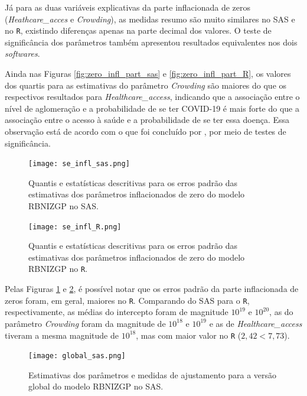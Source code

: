 \documentclass[12pt, a4paper, twoside]{report}
\numberwithin{equation}{section} %
\begin{document}
Já para as duas variáveis explicativas da parte inflacionada de zeros (\textit{Heathcare\_acces} e \textit{Crowding}), as medidas resumo são muito similares no SAS e no \texttt{R}, existindo diferenças apenas na parte decimal dos valores. O teste de significância dos parâmetros também apresentou resultados equivalentes nos dois \textit{softwares}.

Ainda nas Figuras \ref{fig:zero_infl_part_sas} e \ref{fig:zero_infl_part_R}, os valores dos quartis para as estimativas do parâmetro \textit{Crowding} são maiores do que os respectivos resultados para \textit{Healthcare\_access}, indicando que a associação entre o nível de aglomeração e a probabilidade de se ter COVID-19 é mais forte do que a associação entre o acesso à saúde e a probabilidade de se ter essa doença. Essa observação está de acordo com o que foi concluído por \cite{sousa2022}, por meio de testes de significância.

\begin{figure}[!htb]
    \centering
    \texttt{[image: se\_infl\_sas.png]}
    \caption{Quantis e estatísticas descritivas para os erros padrão das estimativas dos parâmetros inflacionados de zero do modelo RBNIZGP no SAS.}
\label{fig:se_infl_sas}
\end{figure}

\begin{figure}[!htb]
    \centering
    \texttt{[image: se\_infl\_R.png]}
    \caption{Quantis e estatísticas descritivas para os erros padrão das estimativas dos parâmetros inflacionados de zero do modelo RBNIZGP no \texttt{R}.}
\label{fig:se_infl_R}
\end{figure}

Pelas Figuras \ref{fig:se_infl_sas} e \ref{fig:se_infl_R}, é possível notar que os erros padrão da parte inflacionada de zeros foram, em geral, maiores no \texttt{R}. Comparando do SAS para o \texttt{R}, respectivamente, as médias do intercepto foram de magnitude $10^{19}$ e $10^{20}$, as do parâmetro \textit{Crowding} foram da magnitude de $10^{18}$ e $10^{19}$ e as de \textit{Healthcare\_access} tiveram a mesma magnitude de $10^{18}$, mas com maior valor no \texttt{R} ($2,42<7,73$).

\begin{figure}[!htb]
    \centering
    \texttt{[image: global\_sas.png]}
    \caption{Estimativas dos parâmetros e medidas de ajustamento para a versão global do modelo RBNIZGP no SAS.}
\label{fig:global_sas}
\end{figure}
\end{document}

